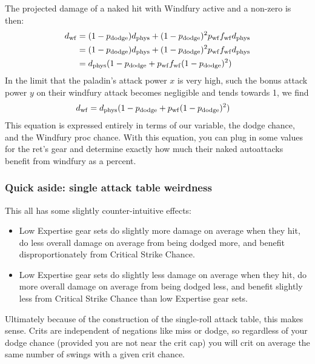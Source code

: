 The projected damage of a naked hit with Windfury active and a non-zero \pdodge is then:
\begin{equation*}
	\begin{aligned}
		d_\mathrm{wf} &= (1 - p_{\mathrm{dodge}} ) d_{\mathrm{phys}}  + (1 - p_{\mathrm{dodge}} )^2 p_{\mathrm{wf}}  f_{\mathrm{wf}}  d_{\mathrm{phys}} \\
		&= (1 - p_{\mathrm{dodge}} ) d_{\mathrm{phys}}  + (1 - p_{\mathrm{dodge}} )^2 p_{\mathrm{wf}}  f_{\mathrm{wf}}  d_{\mathrm{phys}}  \\
				&= d_{\mathrm{phys}} (1 - p_{\mathrm{dodge}}  + p_{\mathrm{wf}} f_{\mathrm{wf}} (1 -p_{\mathrm{dodge}} )^2) \\
	\end{aligned}
\end{equation*}
In the limit that the paladin's attack power $x$ is very high, such the bonus attack power $y$ on their windfury attack becomes negligible and \fwf tends towards 1, we find
\begin{equation*}
	\begin{aligned}
		d_\mathrm{wf}  &= d_{\mathrm{phys}} (1 - p_{\mathrm{dodge}}  + p_{\mathrm{wf}} (1 -p_{\mathrm{dodge}} )^2)
	\end{aligned}
\end{equation*}
This equation is expressed entirely in terms of our \dphys variable, the dodge chance, and the Windfury proc chance.
With this equation, you can plug in some values for the ret's gear and determine exactly how much their naked autoattacks benefit from windfury as a percent.


\subsubsection{Quick aside: single attack table weirdness}
This all has some slightly counter-intuitive effects:
\begin{itemize}
	\item Low Expertise gear sets do slightly more damage on average when they hit, do less overall damage on average from being dodged more, and benefit disproportionately from Critical Strike Chance.
	\item Low Expertise gear sets do slightly less damage on average when they hit, do more overall damage on average from being dodged less, and benefit slightly less from Critical Strike Chance than low Expertise gear sets.
\end{itemize}
Ultimately because of the construction of the single-roll attack table, this makes sense.
Crits are independent of negations like miss or dodge, so regardless of your dodge chance (provided you are not near the crit cap) you will crit on average the same number of swings with a given crit chance.

